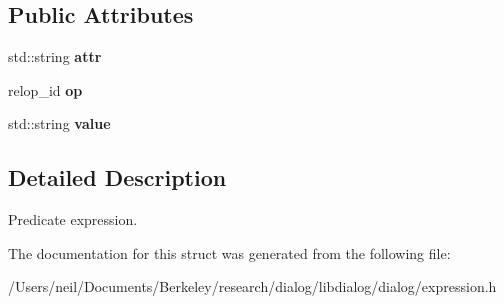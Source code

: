 \subsection*{Public Attributes}
\begin{DoxyCompactItemize}
\item 
\mbox{\label{structdialog_1_1predicate__t_ad196d850f4d5b21587eec65b7fcd4a86}} 
std\+::string {\bfseries attr}
\item 
\mbox{\label{structdialog_1_1predicate__t_a6c416dda4b31ab90d25f9cac399cc66b}} 
relop\+\_\+id {\bfseries op}
\item 
\mbox{\label{structdialog_1_1predicate__t_a683944377ed3216bfbc2c08da9410645}} 
std\+::string {\bfseries value}
\end{DoxyCompactItemize}


\subsection{Detailed Description}
Predicate expression. 

The documentation for this struct was generated from the following file\+:\begin{DoxyCompactItemize}
\item 
/\+Users/neil/\+Documents/\+Berkeley/research/dialog/libdialog/dialog/expression.\+h\end{DoxyCompactItemize}
